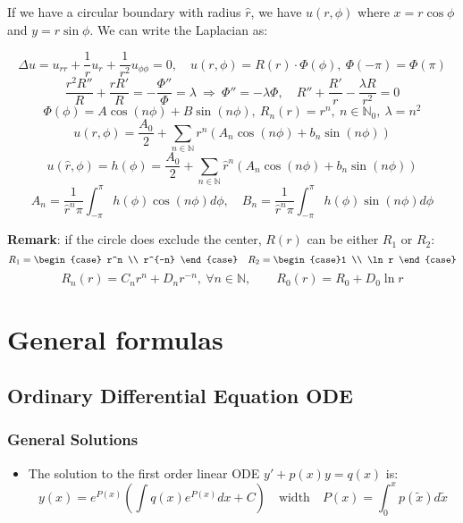 \documentclass{article}
\begin{document}
\begin{twocolumn}
If we have a circular boundary with radius $\hat{r}$, we have $u(r,\phi)$ where $x=r \cos \phi$ and $y = r \sin \phi$. We can write the Laplacian as:

$$\Delta u = u_{rr} + \frac1r u_r + \frac{1}{r^2} u_{\phi \phi} = 0, \quad u(r,\phi) = R(r) \cdot \Phi(\phi), \ \Phi(-\pi) = \Phi(\pi)$$
$$\frac{r^2 R''}{R} + \frac{r R'}{R} = -\frac{\Phi''}{\Phi} = \lambda \ \Rightarrow \ \Phi'' = -\lambda \Phi, \quad R'' + \frac{R'}{r} - \frac{\lambda R}{r^2} = 0$$
$$\Phi(\phi) = A \cos(n \phi) + B \sin(n \phi), \ R_n(r) = r^n, \ n \in \mathbb{N}_0, \ \lambda = n^2$$
$$u(r,\phi) = \frac{A_0}{2} + \sum_{n \in \mathbb{N}} r^n \left(A_n \cos(n\phi) + b_n \sin(n\phi)\right)$$
$$u(\hat r, \phi) = h(\phi) = \frac{A_0}{2} + \sum_{n \in \mathbb{N}} \hat r^n \left(A_n \cos(n\phi) + b_n \sin(n\phi)\right)$$
$$A_n = \frac{1}{\hat r^n \pi} \int_{-\pi}^{\pi} h(\phi) \cos(n\phi) d\phi, \quad B_n = \frac{1}{\hat r^n\pi} \int_{-\pi}^{\pi} h(\phi) \sin(n\phi) d\phi $$

\textbf{Remark}: if the circle does exclude the center, $R(r)$ can be either $R_1$ or $R_2$:
$$R_1 = \begin{case} r^n \\ r^{-n} \end{case} \quad R_2 = \begin{case}1 \\ \ln r \end{case}$$
$$R_n(r) = C_n r^n + D_n r^{-n}, \ \forall n \in \mathbb{N}, \qquad R_0(r) = R_0 + D_0 \ln r$$

\section{General formulas}

\subsection{Ordinary Differential Equation ODE}

\subsubsection{General Solutions}

\begin{itemize}

\item The solution to the first order linear ODE $y' + p(x) y = q(x)$ is:
$$y(x) = e^{P(x)} \left( \int q(x) e^{P(x)} dx + C \right) \quad \text{width} \quad P(x) = \int_{0}^{x} p(\tilde x) d\tilde x$$


\end{itemize}
\end{twocolumn}
\end{document}
